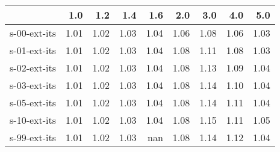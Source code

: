 \begin{tabular}{lrrrrrrrr}
\toprule
{} &  1.0 &  1.2 &  1.4 &  1.6 &  2.0 &  3.0 &  4.0 &  5.0 \\
\midrule
s-00-ext-its & 1.01 & 1.02 & 1.03 & 1.04 & 1.06 & 1.08 & 1.06 & 1.03 \\
s-01-ext-its & 1.01 & 1.02 & 1.03 & 1.04 & 1.08 & 1.11 & 1.08 & 1.03 \\
s-02-ext-its & 1.01 & 1.02 & 1.03 & 1.04 & 1.08 & 1.13 & 1.09 & 1.04 \\
s-03-ext-its & 1.01 & 1.02 & 1.03 & 1.04 & 1.08 & 1.14 & 1.10 & 1.04 \\
s-05-ext-its & 1.01 & 1.02 & 1.03 & 1.04 & 1.08 & 1.14 & 1.11 & 1.04 \\
s-10-ext-its & 1.01 & 1.02 & 1.03 & 1.04 & 1.08 & 1.15 & 1.11 & 1.05 \\
s-99-ext-its & 1.01 & 1.02 & 1.03 &  nan & 1.08 & 1.14 & 1.12 & 1.04 \\
\bottomrule
\end{tabular}
